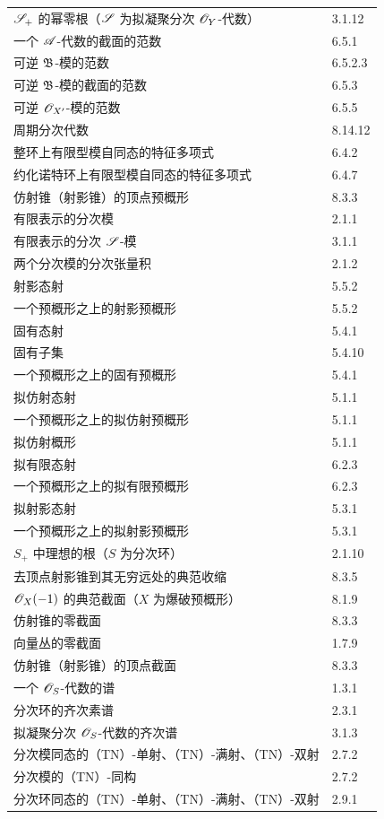 \begin{longtable}{@{}p{}@{\hspace{1em}}p{}@{}}
$\mathscr S_+$ 的幂零根（$\mathscr S$ 为拟凝聚分次 $\mathscr O_Y$-代数）&3.1.12\\
一个 $\mathscr A$-代数的截面的范数 &6.5.1\\
可逆 $\mathfrak B$-模的范数 &6.5.2.3\\
可逆 $\mathfrak B$-模的截面的范数 &6.5.3\\
可逆 $\mathscr O_{X'}$-模的范数 &6.5.5\\
周期分次代数 &8.14.12\\
整环上有限型模自同态的特征多项式 &6.4.2\\
约化诺特环上有限型模自同态的特征多项式 &6.4.7\\
仿射锥（射影锥）的顶点预概形 &8.3.3\\
有限表示的分次模 &2.1.1\\
有限表示的分次 $\mathscr S$-模 &3.1.1\\
两个分次模的分次张量积 &2.1.2\\
射影态射 &5.5.2\\
一个预概形之上的射影预概形 &5.5.2\\
固有态射 &5.4.1\\
固有子集 &5.4.10\\
一个预概形之上的固有预概形 &5.4.1\\
拟仿射态射 &5.1.1\\
一个预概形之上的拟仿射预概形 &5.1.1\\
拟仿射概形 &5.1.1\\
拟有限态射 &6.2.3\\
一个预概形之上的拟有限预概形 &6.2.3\\
拟射影态射 &5.3.1\\
一个预概形之上的拟射影预概形 &5.3.1\\
$S_+$ 中理想的根（$S$ 为分次环）&2.1.10\\
去顶点射影锥到其无穷远处的典范收缩 &8.3.5\\
$\mathscr O_X(-1)$ 的典范截面（$X$ 为爆破预概形）&8.1.9\\
仿射锥的零截面 &8.3.3\\
向量丛的零截面 &1.7.9\\
仿射锥（射影锥）的顶点截面 &8.3.3\\
一个 $\mathscr O_S$-代数的谱 &1.3.1\\
分次环的齐次素谱 &2.3.1\\
拟凝聚分次 $\mathscr O_S$-代数的齐次谱 &3.1.3\\
分次模同态的（TN）-单射、（TN）-满射、（TN）-双射 &2.7.2\\
分次模的（TN）-同构 &2.7.2\\
分次环同态的（TN）-单射、（TN）-满射、（TN）-双射 &2.9.1\\

\end{longtable}
